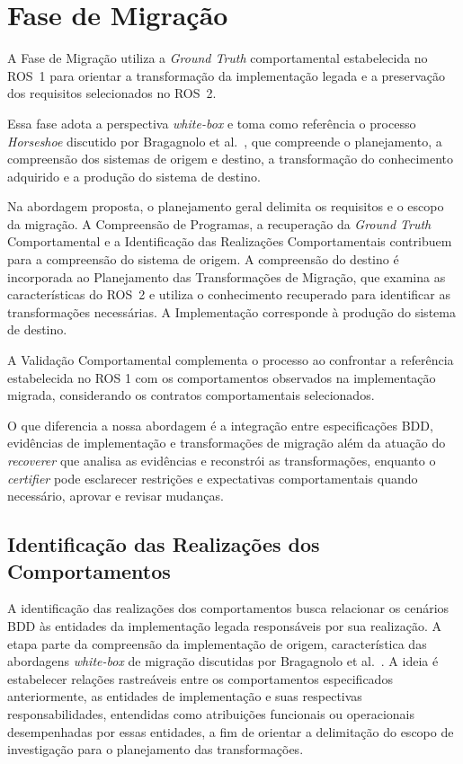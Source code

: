 \section{Fase de Migração}
\label{sec:fase-migracao}

A Fase de Migração utiliza a \textit{Ground Truth} comportamental estabelecida no ROS~1 para orientar a transformação da implementação legada e a preservação dos requisitos selecionados no ROS~2.

Essa fase adota a perspectiva \textit{white-box} e toma como referência o processo \textit{Horseshoe} discutido por Bragagnolo et al.~\cite{BragagnoloMigration}, que compreende o planejamento, a compreensão dos sistemas de origem e destino, a transformação do conhecimento adquirido e a produção do sistema de destino.

Na abordagem proposta, o planejamento geral delimita os requisitos e o escopo da migração. A Compreensão de Programas, a recuperação da \textit{Ground Truth} Comportamental e a Identificação das Realizações Comportamentais contribuem para a compreensão do sistema de origem. A compreensão do destino é incorporada ao Planejamento das Transformações de Migração, que examina as características do ROS~2 e utiliza o conhecimento recuperado para identificar as transformações necessárias. A Implementação corresponde à produção do sistema de destino.


A Validação Comportamental complementa o processo ao confrontar a referência estabelecida no ROS 1 com os comportamentos observados na implementação migrada, considerando os contratos comportamentais selecionados.


O que diferencia a nossa abordagem é a integração entre especificações BDD, evidências de implementação e transformações de migração além da atuação do \textit{recoverer} que analisa as evidências e reconstrói as transformações, enquanto o \textit{certifier} pode esclarecer restrições e expectativas comportamentais quando necessário, aprovar e revisar mudanças.




\subsection{Identificação das Realizações dos Comportamentos}
\label{sec:identificacao-realizacoes-comportamentos}


A identificação das realizações dos comportamentos busca relacionar os cenários BDD às entidades da implementação legada responsáveis por sua realização. A etapa parte da compreensão da implementação de origem, característica das abordagens \textit{white-box} de migração discutidas por Bragagnolo et al.~\cite{BragagnoloMigration}. A ideia é estabelecer relações rastreáveis entre os comportamentos especificados anteriormente, as entidades de implementação e suas respectivas responsabilidades, entendidas como atribuições funcionais ou operacionais desempenhadas por essas entidades, a fim de orientar a delimitação do escopo de investigação para o planejamento das transformações.

